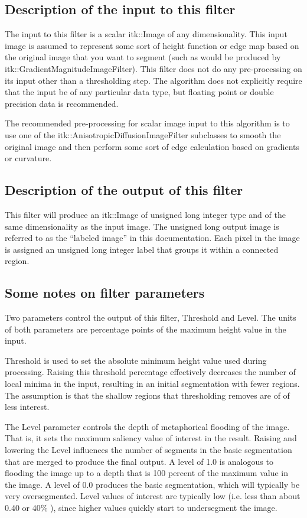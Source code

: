 \documentclass{article}
\begin{document}
\subsection{Description of the input to this filter}
The input to this filter is a scalar itk::Image of any dimensionality. This input image is assumed to represent some sort of height function or edge map based on the original image that you want to segment (such as would be produced by itk::GradientMagnitudeImageFilter). This filter does not do any pre-processing on its input other than a thresholding step. The algorithm does not explicitly require that the input be of any particular data type, but floating point or double precision data is recommended.


The recommended pre-processing for scalar image input to this algorithm is to use one of the itk::AnisotropicDiffusionImageFilter subclasses to smooth the original image and then perform some sort of edge calculation based on gradients or curvature.

\subsection{Description of the output of this filter}
This filter will produce an itk::Image of unsigned long integer type and of the same dimensionality as the input image. The unsigned long output image is referred to as the ``labeled image'' in this documentation. Each pixel in the image is assigned an unsigned long integer label that groups it within a connected region.

\subsection{Some notes on filter parameters}
Two parameters control the output of this filter, Threshold and Level. The units of both parameters are percentage points of the maximum height value in the input.


Threshold is used to set the absolute minimum height value used during processing. Raising this threshold percentage effectively decreases the number of local minima in the input, resulting in an initial segmentation with fewer regions. The assumption is that the shallow regions that thresholding removes are of of less interest.


The Level parameter controls the depth of metaphorical flooding of the image. That is, it sets the maximum saliency value of interest in the result. Raising and lowering the Level influences the number of segments in the basic segmentation that are merged to produce the final output. A level of 1.0 is analogous to flooding the image up to a depth that is 100 percent of the maximum value in the image. A level of 0.0 produces the basic segmentation, which will typically be very oversegmented. Level values of interest are typically low (i.e. less than about 0.40 or 40\% ), since higher values quickly start to undersegment the image.
\end{document}
